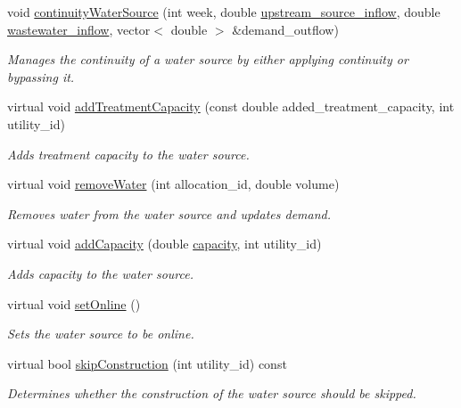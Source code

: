 \begin{DoxyCompactItemize}
void \mbox{\hyperlink{classWaterSource_a1137cd86f8d3f8a48ebec54282132993}{continuity\+Water\+Source}} (int week, double \mbox{\hyperlink{classWaterSource_a7a69b2e9b6030f1035e6cf44d2918ee5}{upstream\+\_\+source\+\_\+inflow}}, double \mbox{\hyperlink{classWaterSource_aeb5a2d2d83383a70ca20f3e94635a9c7}{wastewater\+\_\+inflow}}, vector$<$ double $>$ \&demand\+\_\+outflow)
\begin{DoxyCompactList}\small\item\em Manages the continuity of a water source by either applying continuity or bypassing it. \end{DoxyCompactList}\item 
virtual void \mbox{\hyperlink{classWaterSource_ac2bc1a09fce3a3201d62a73052b27b0b}{add\+Treatment\+Capacity}} (const double added\+\_\+treatment\+\_\+capacity, int utility\+\_\+id)
\begin{DoxyCompactList}\small\item\em Adds treatment capacity to the water source. \end{DoxyCompactList}\item 
virtual void \mbox{\hyperlink{classWaterSource_a4a4d948033c57feb8523bd7d5828c59b}{remove\+Water}} (int allocation\+\_\+id, double volume)
\begin{DoxyCompactList}\small\item\em Removes water from the water source and updates demand. \end{DoxyCompactList}\item 
virtual void \mbox{\hyperlink{classWaterSource_ab869abb3d3dde1875e933482bedc3ae3}{add\+Capacity}} (double \mbox{\hyperlink{classWaterSource_a2ec257b415b248214a8bce7fc5267723}{capacity}}, int utility\+\_\+id)
\begin{DoxyCompactList}\small\item\em Adds capacity to the water source. \end{DoxyCompactList}\item 
virtual void \mbox{\hyperlink{classWaterSource_aaa55dc6e14ff184380300147b53c56ec}{set\+Online}} ()
\begin{DoxyCompactList}\small\item\em Sets the water source to be online. \end{DoxyCompactList}\item 
virtual bool \mbox{\hyperlink{classWaterSource_ad8496aea2d4ff97c8069b61cc984c799}{skip\+Construction}} (int utility\+\_\+id) const
\begin{DoxyCompactList}\small\item\em Determines whether the construction of the water source should be skipped. \end{DoxyCompactList}\item 

\end{DoxyCompactItemize}

